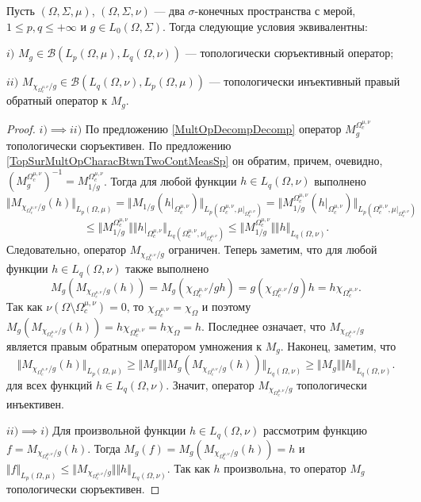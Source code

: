 \begin{proposition}\label{TopSurMultOpDescBtwnTwoMeasSp} Пусть $(\Omega,\Sigma,\mu)$, $(\Omega,\Sigma,\nu)$ --- два $\sigma$-конечных пространства с мерой, $1\leq p,q\leq +\infty$ и $g\in L_0(\Omega,\Sigma)$. Тогда следующие условия эквивалентны:

$i)$ $M_g\in\mathcal{B}(L_p(\Omega,\mu),L_q(\Omega,\nu))$ --- топологически сюръективный оператор;

$ii)$ $M_{\chi_{\Omega_c^{\mu,\nu}}/g}\in\mathcal{B}(L_q(\Omega,\nu), L_p(\Omega,\mu))$ --- топологически инъективный правый обратный оператор к $M_g$.
\end{proposition}
\begin{proof}
$i)$$\implies$$ ii)$ По предложению \ref{MultOpDecompDecomp} оператор $M_g^{\Omega_c^{\mu,\nu}}$ топологически сюръективен. По предложению \ref{TopSurMultOpCharacBtwnTwoContMeasSp} он обратим, причем, очевидно, $(M_g^{\Omega_c^{\mu,\nu}})^{-1}=M_{1/g}^{\Omega_c^{\mu,\nu}}$. Тогда для любой функции $h\in L_q(\Omega,\nu)$ выполнено
$$
\Vert M_{\chi_{\Omega_c^{\mu,\nu}}/g}(h)\Vert_{L_p(\Omega,\mu)}=
\Vert M_{1/g}(h|_{\Omega_c^{\mu,\nu}})\Vert_{L_p(\Omega_c^{\mu,\nu},\mu|_{\Omega_c^{\mu,\nu}})}=
\Vert M_{1/g}^{\Omega_c^{\mu,\nu}}(h|_{\Omega_c^{\mu,\nu}})\Vert_{L_p(\Omega_c^{\mu,\nu},\mu|_{\Omega_c^{\mu,\nu}})}
$$
$$
\leq\Vert M_{1/g}^{\Omega_c^{\mu,\nu}}\Vert\Vert h|_{\Omega_c^{\mu,\nu}}\Vert_{L_q(\Omega_c^{\mu,\nu},\nu|_{\Omega_c^{\mu,\nu}})}
\leq\Vert M_{1/g}^{\Omega_c^{\mu,\nu}}\Vert\Vert h\Vert_{L_q(\Omega,\nu)}.
$$ 
Следовательно, оператор $M_{\chi_{\Omega_c^{\mu,\nu}}/g}$ ограничен. Теперь заметим, что для любой функции $h\in L_q(\Omega,\nu)$ также выполнено
$$
M_g(M_{\chi_{\Omega_c^{\mu,\nu}}/g}(h))
=M_g(\chi_{\Omega_c^{\mu,\nu}}/g  h)
=g (\chi_{\Omega_c^{\mu,\nu}}/g)   h
=h \chi_{\Omega_c^{\mu,\nu}}.
$$
Так как $\nu(\Omega\setminus\Omega_c^{\mu,\nu})=0$, то $\chi_{\Omega_c^{\mu,\nu}}=\chi_{\Omega}$ и поэтому $M_g(M_{\chi_{\Omega_c^{\mu,\nu}}/g}(h))=h \chi_{\Omega_c^{\mu,\nu}}=h \chi_{\Omega}=h$. Последнее означает, что $M_{\chi_{\Omega_c^{\mu,\nu}}/g}$ является правым обратным оператором умножения к $M_g$. Наконец, заметим, что
$$
\Vert M_{\chi_{\Omega_c^{\mu,\nu}}/g}(h)\Vert_{L_p(\Omega,\mu)}
\geq\Vert M_g\Vert\Vert M_g(M_{\chi_{\Omega_c^{\mu,\nu}}/g}(h))\Vert_{L_q(\Omega,\nu)}
\geq\Vert M_g\Vert\Vert h\Vert_{L_q(\Omega,\nu)}.
$$
для всех функций $h\in L_q(\Omega,\nu)$. Значит, оператор $M_{\chi_{\Omega_c^{\mu,\nu}}/g}$ топологически инъективен.

$ii)$$\implies$$ i)$ Для произвольной функции $h\in L_q(\Omega,\nu)$ рассмотрим функцию $f=M_{\chi_{\Omega_c^{\mu,\nu}}/g}(h)$. Тогда $M_g(f)=M_g(M_{\chi_{\Omega_c^{\mu,\nu}}/g}(h))=h$ и $\Vert f\Vert_{L_p(\Omega,\mu)}\leq\Vert M_{\chi_{\Omega_c^{\mu,\nu}}/g}\Vert\Vert h\Vert_{L_q(\Omega,\nu)}$. Так как $h$ произвольна, то оператор $M_g$ топологически сюръективен.
\end{proof}

